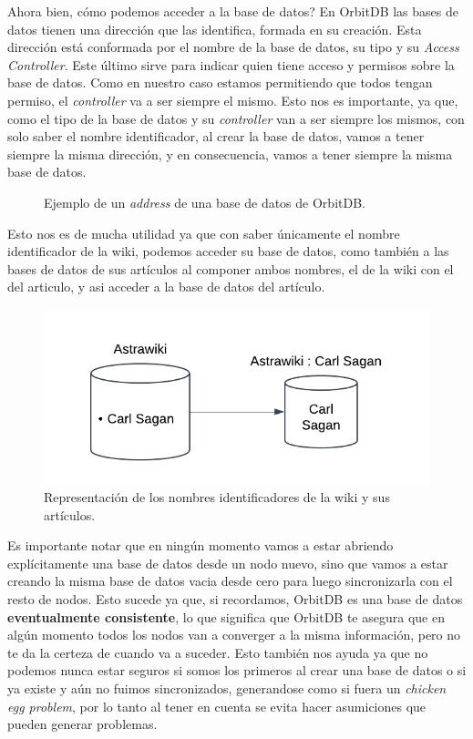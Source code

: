 Ahora bien, cómo podemos acceder a la base de datos? En OrbitDB las bases de datos tienen una dirección que las identifica, formada en su creación. Esta dirección está conformada por el nombre de la base de datos, su tipo y su \textit{Access Controller}. Este último sirve para indicar quien tiene acceso y permisos sobre la base de datos. Como en nuestro caso estamos permitiendo que todos tengan permiso, el \textit{controller} va a ser siempre el mismo. Esto nos es importante, ya que, como el tipo de la base de datos y su \textit{controller} van a ser siempre los mismos, con solo saber el nombre identificador, al crear la base de datos, vamos a tener siempre la misma dirección, y en consecuencia, vamos a tener siempre la misma base de datos. 

\begin{figure}[H]
\centering
{}
\caption{Ejemplo de un \textit{address} de una base de datos de OrbitDB.}
\end{figure}

Esto nos es de mucha utilidad ya que con saber únicamente el nombre identificador de la wiki, podemos acceder su base de datos, como también a las bases de datos de sus artículos al componer ambos nombres, el de la wiki con el del articulo, y asi acceder a la base de datos del artículo.

\begin{figure}[H]
    \centering
    \includegraphics[width=0.6\linewidth]{img/solucion-ipfs/bdd-names.png}
    \caption{Representación de los nombres identificadores de la wiki y sus artículos.}
    \label{fig:bdd-names}
\end{figure}

Es importante notar que en ningún momento vamos a estar abriendo explícitamente una base de datos desde un nodo nuevo, sino que vamos a estar creando la misma base de datos vacia desde cero para luego sincronizarla con el resto de nodos. Esto sucede ya que, si recordamos, OrbitDB es una base de datos \textbf{eventualmente consistente}, lo que significa que OrbitDB te asegura que en algún momento todos los nodos van a converger a la misma información, pero no te da la certeza de cuando va a suceder. Esto también nos ayuda ya que no podemos nunca estar seguros si somos los primeros al crear una base de datos o si ya existe y aún no fuimos sincronizados, generandose como si fuera un \textit{chicken egg problem}, por lo tanto al tener en cuenta se evita hacer asumiciones que pueden generar problemas.

